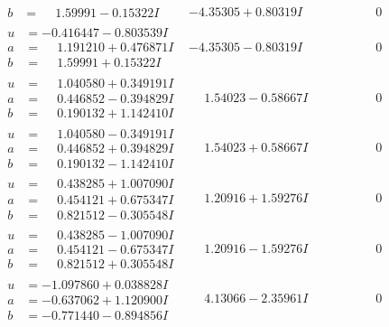 \documentclass[1p]{elsarticle_modified}
\theoremstyle{definition}
\begin{document}
$$\begin{array}{c|c|c}
\begin{aligned}
b &= \phantom{-}1.59991 - 0.15322 I\end{aligned}
 & -4.35305 + 0.80319 I & \phantom{-0.000000 } 0 \\ \hline\begin{aligned}
u &= -0.416447 - 0.803539 I \\
a &= \phantom{-}1.191210 + 0.476871 I \\
b &= \phantom{-}1.59991 + 0.15322 I\end{aligned}
 & -4.35305 - 0.80319 I & \phantom{-0.000000 } 0 \\ \hline\begin{aligned}
u &= \phantom{-}1.040580 + 0.349191 I \\
a &= \phantom{-}0.446852 - 0.394829 I \\
b &= \phantom{-}0.190132 + 1.142410 I\end{aligned}
 & \phantom{-}1.54023 - 0.58667 I & \phantom{-0.000000 } 0 \\ \hline\begin{aligned}
u &= \phantom{-}1.040580 - 0.349191 I \\
a &= \phantom{-}0.446852 + 0.394829 I \\
b &= \phantom{-}0.190132 - 1.142410 I\end{aligned}
 & \phantom{-}1.54023 + 0.58667 I & \phantom{-0.000000 } 0 \\ \hline\begin{aligned}
u &= \phantom{-}0.438285 + 1.007090 I \\
a &= \phantom{-}0.454121 + 0.675347 I \\
b &= \phantom{-}0.821512 - 0.305548 I\end{aligned}
 & \phantom{-}1.20916 + 1.59276 I & \phantom{-0.000000 } 0 \\ \hline\begin{aligned}
u &= \phantom{-}0.438285 - 1.007090 I \\
a &= \phantom{-}0.454121 - 0.675347 I \\
b &= \phantom{-}0.821512 + 0.305548 I\end{aligned}
 & \phantom{-}1.20916 - 1.59276 I & \phantom{-0.000000 } 0 \\ \hline\begin{aligned}
u &= -1.097860 + 0.038828 I \\
a &= -0.637062 + 1.120900 I \\
b &= -0.771440 - 0.894856 I\end{aligned}
 & \phantom{-}4.13066 - 2.35961 I & \phantom{-0.000000 } 0 \\ \hline\begin{aligned}

\end{aligned}
\end{array}$$
\end{document}

